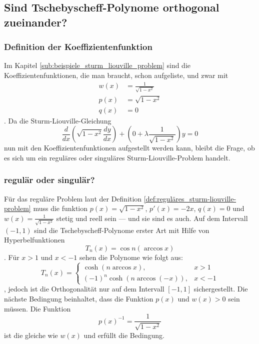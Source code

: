 %
%
%

\subsection{Sind Tschebyscheff-Polynome orthogonal zueinander?\label{sub:tschebyscheff-polynome}}
\subsubsection*{Definition der Koeffizientenfunktion}
Im Kapitel \ref{sub:beispiele_sturm_liouville_problem} sind die Koeffizientenfunktionen, die man braucht, schon aufgeliste, und zwar mit
\begin{align*}
	w(x) &= \frac{1}{\sqrt{1-x^2}} \\
	p(x) &= \sqrt{1-x^2} \\
	q(x) &= 0
\end{align*}.
Da die Sturm-Liouville-Gleichung
\begin{equation}
	\label{eq:sturm-liouville-equation-tscheby}
	\frac{d}{dx} (\sqrt{1-x^2} \frac{dy}{dx}) + (0 + \lambda \frac{1}{\sqrt{1-x^2}}) y = 0 
\end{equation}
nun mit den Koeffizientenfunktionen aufgestellt werden kann, bleibt die Frage, ob es sich um ein reguläres oder singuläres Sturm-Liouville-Problem handelt.

\subsubsection*{regulär oder singulär?}
Für das reguläre Problem laut der Definition \ref{def:reguläres_sturm-liouville-problem} muss die funktion $p(x) = \sqrt{1-x^2}$, $p'(x) = -2x$, $q(x) = 0$ und $w(x) = \frac{1}{\sqrt{1-x^2}}$ stetig und reell sein --- und sie sind es auch.
Auf dem Intervall $(-1,1)$ sind die Tschebyscheff-Polynome erster Art mit Hilfe von Hyperbelfunktionen
\begin{equation}
	T_n(x) = \cos n (\arccos x)
\end{equation}.
Für $x>1$ und $x<-1$ sehen die Polynome wie folgt aus:
\begin{equation}
	T_n(x) = \left\{\begin{array}{ll} \cosh (n \arccos x), & x > 1\\
		(-1)^n \cosh (n \arccos (-x)), & x<-1 \end{array}\right.
\end{equation},
jedoch ist die Orthogonalität nur auf dem Intervall $[ -1, 1]$ sichergestellt.
Die nächste Bedingung beinhaltet, dass die Funktion $p(x)$ und $w(x)>0$ sein müssen.
Die Funktion
\begin{equation*}
	p(x)^{-1} = \frac{1}{\sqrt{1-x^2}}
\end{equation*}
ist die gleiche wie $w(x)$ und erfüllt die Bedingung.

